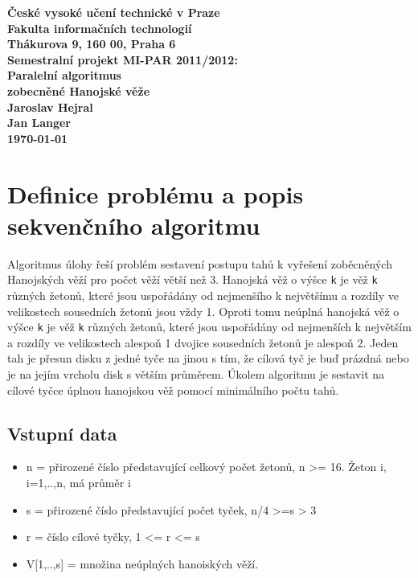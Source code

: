 \documentclass[12pt]{article}
\begin{document}

\begin{center}
\bf České vysoké učení technické v Praze\\[2mm]
	Fakulta informačních technologií\\[2mm]
	Thákurova 9, 160 00, Praha 6\\[15mm]
	\textbf{Semestralní projekt MI-PAR 2011/2012:\\
    Paralelní algoritmus \\
    zobecněné Hanojské věže}\\[5mm]
       Jaroslav Hejral\\
       Jan Langer\\[2mm]
\today\\[12mm]
\end{center}

\section{Definice problému a popis sekvenčního algoritmu}
Algoritmus úlohy řeší problém sestavení postupu tahů k vyřešení zoběcněných
Hanojských věží pro počet věží větší než 3. Hanojská věž o výšce \verb|k| je věž
\verb|k| různých žetonů, které jsou uspořádány od nejmenšího k největšímu a
rozdíly ve velikostech sousedních žetonů jsou vždy 1. Oproti tomu neúplná
hanojská věž o výšce \verb|k| je věž \verb|k| různých žetonů, které jsou
uspořádány od nejmenších k největším a rozdíly ve velikostech alespoň 1 dvojice
sousedních žetonů je alespoň 2. Jeden tah je přesun disku z jedné tyče na jinou
s tím, že cílová tyč je buď prázdná nebo je na jejím vrcholu disk s větším
průměrem. Úkolem algoritmu je sestavit na cílové tyčce úplnou hanojskou věž
pomocí minimálního počtu tahů.

\subsection{Vstupní data}
\begin{itemize}
\item n = přirozené číslo představující celkový počet žetonů, n >=
16. Žeton i, i=1,..,n, má průměr i
\item s = přirozené číslo představující počet tyček, n/4 >=s > 3
\item r = číslo cílové tyčky, 1 <= r <= s
\item V[1,..,s] = množina neúplných hanoiských věží.
\end{itemize}
\end{document}
